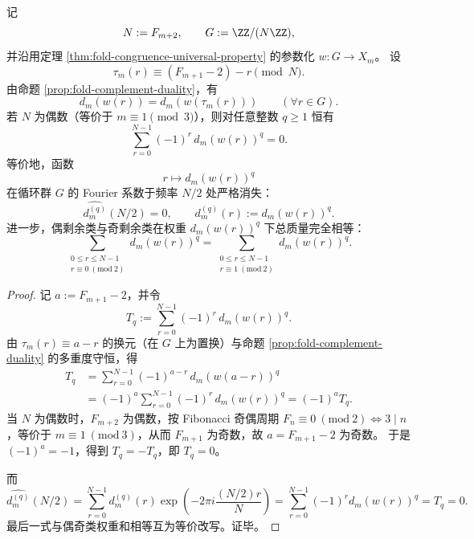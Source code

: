 \begin{proposition}[二阶角色的反射湮灭与模二完全平衡]\label{prop:fold-second-character-reflection-annihilation}
记
\[
N:=F_{m+2},\qquad
G:=\ZZ/(N\ZZ),
\]
并沿用定理 \ref{thm:fold-congruence-universal-property} 的参数化 \(w:G\to X_m\)。
设
\[
\tau_m(r)\equiv (F_{m+1}-2)-r\pmod N.
\]
由命题 \ref{prop:fold-complement-duality}，有
\[
d_m(w(r))=d_m(w(\tau_m(r)))\qquad(\forall r\in G).
\]
若 \(N\) 为偶数（等价于 \(m\equiv 1\pmod 3\)），则对任意整数 \(q\ge 1\) 恒有
\[
\sum_{r=0}^{N-1}(-1)^r\,d_m(w(r))^q=0.
\]
等价地，函数
\[
r\longmapsto d_m(w(r))^q
\]
在循环群 \(G\) 的 Fourier 系数于频率 \(N/2\) 处严格消失：
\[
\widehat{d_m^{(q)}}(N/2)=0,\qquad
d_m^{(q)}(r):=d_m(w(r))^q.
\]
进一步，偶剩余类与奇剩余类在权重 \(d_m(w(r))^q\) 下总质量完全相等：
\[
\sum_{\substack{0\le r\le N-1\\ r\equiv 0\ (\mathrm{mod}\ 2)}} d_m(w(r))^q
=
\sum_{\substack{0\le r\le N-1\\ r\equiv 1\ (\mathrm{mod}\ 2)}} d_m(w(r))^q.
\]
\end{proposition}
\begin{proof}
记 \(a:=F_{m+1}-2\)，并令
\[
T_q:=\sum_{r=0}^{N-1}(-1)^r\,d_m(w(r))^q.
\]
由 \(\tau_m(r)\equiv a-r\) 的换元（在 \(G\) 上为置换）与命题 \ref{prop:fold-complement-duality} 的多重度守恒，得
\[
\begin{aligned}
T_q
&=\sum_{r=0}^{N-1}(-1)^{a-r}\,d_m(w(a-r))^q\\
&=(-1)^a\sum_{r=0}^{N-1}(-1)^r\,d_m(w(r))^q
=(-1)^a T_q.
\end{aligned}
\]
当 \(N\) 为偶数时，\(F_{m+2}\) 为偶数，按 Fibonacci 奇偶周期 \(F_n\equiv 0\ (\mathrm{mod}\ 2)\iff 3\mid n\)，等价于 \(m\equiv 1\ (\mathrm{mod}\ 3)\)，从而 \(F_{m+1}\) 为奇数，故 \(a=F_{m+1}-2\) 为奇数。
于是 \((-1)^a=-1\)，得到 \(T_q=-T_q\)，即 \(T_q=0\)。

而
\[
\widehat{d_m^{(q)}}(N/2)
=
\sum_{r=0}^{N-1}d_m^{(q)}(r)\exp\!\left(-2\pi i\frac{(N/2)r}{N}\right)
=
\sum_{r=0}^{N-1}(-1)^r d_m(w(r))^q
=T_q=0.
\]
最后一式与偶奇类权重和相等互为等价改写。证毕。
\end{proof}

\endinput
